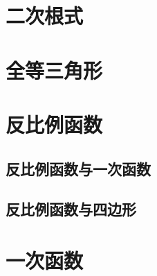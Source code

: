 \documentclass{ecnuthesis}
\begin{document}
\frontmatter



\mainmatter

\chapter{二次根式}
\chapter{全等三角形}
\chapter{反比例函数}
\section{反比例函数与一次函数}
\section{反比例函数与四边形}
\chapter{一次函数}
\end{document}

